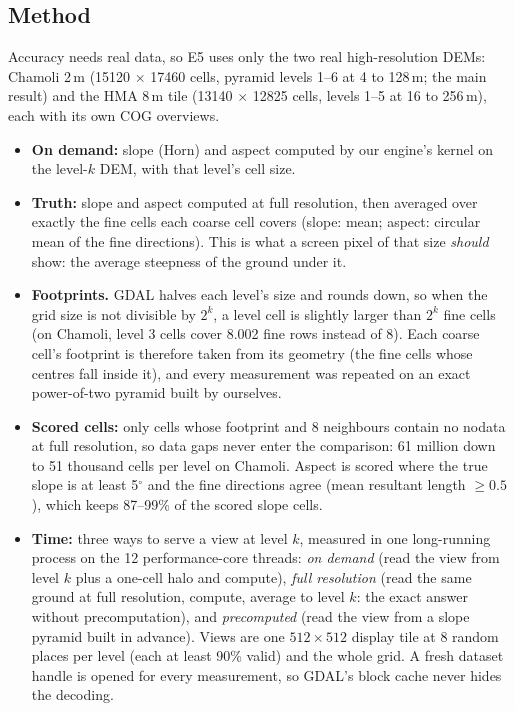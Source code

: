 \documentclass[11pt,a4paper]{article}
\begin{document}
\subsection{Method}
Accuracy needs real data, so E5 uses only the two real high-resolution DEMs: Chamoli 2\,m (15120 $\times$ 17460
cells, pyramid levels 1--6 at 4 to 128\,m; the main result) and the HMA 8\,m tile (13140 $\times$ 12825 cells,
levels 1--5 at 16 to 256\,m), each with its own COG overviews.
\begin{itemize}
  \item \textbf{On demand:} slope (Horn) and aspect computed by our engine's kernel on the level-$k$ DEM, with that
  level's cell size.
  \item \textbf{Truth:} slope and aspect computed at full resolution, then averaged over exactly the fine cells each
  coarse cell covers (slope: mean; aspect: circular mean of the fine directions). This is what a screen pixel of that
  size \emph{should} show: the average steepness of the ground under it.
  \item \textbf{Footprints.} GDAL halves each level's size and rounds down, so when the grid size is not divisible by
  $2^k$, a level cell is slightly larger than $2^k$ fine cells (on Chamoli, level 3 cells cover 8.002 fine rows
  instead of 8). Each coarse cell's footprint is therefore taken from its geometry (the fine cells whose centres fall
  inside it), and every measurement was repeated on an exact power-of-two pyramid built by ourselves.
  \item \textbf{Scored cells:} only cells whose footprint and 8 neighbours contain no nodata at full resolution, so
  data gaps never enter the comparison: 61 million down to 51 thousand cells per level on Chamoli. Aspect is scored
  where the true slope is at least 5$^\circ$ and the fine directions agree (mean resultant length $\geq0.5$), which
  keeps 87--99\% of the scored slope cells.
  \item \textbf{Time:} three ways to serve a view at level $k$, measured in one long-running process on the 12
  performance-core threads: \emph{on demand} (read the view from level $k$ plus a one-cell halo and compute),
  \emph{full resolution} (read the same ground at full resolution, compute, average to level $k$: the exact answer
  without precomputation), and \emph{precomputed} (read the view from a slope pyramid built in advance). Views are one
  $512\times512$ display tile at 8 random places per level (each at least 90\% valid) and the whole grid. A fresh
  dataset handle is opened for every measurement, so GDAL's block cache never hides the decoding.
\end{itemize}
\end{document}
